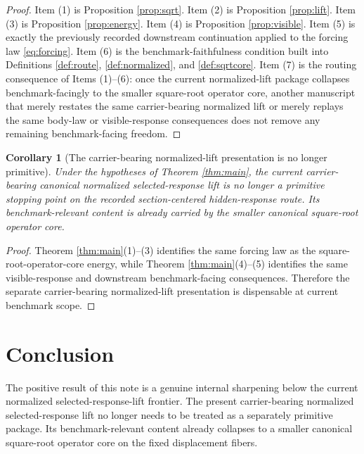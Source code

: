 \documentclass[11pt]{article}
\newtheorem{corollary}{Corollary}
\begin{document}
\begin{proof}
Item (1) is Proposition \ref{prop:sqrt}. Item (2) is Proposition \ref{prop:lift}. Item (3) is Proposition \ref{prop:energy}. Item (4) is Proposition \ref{prop:visible}. Item (5) is exactly the previously recorded downstream continuation applied to the forcing law \eqref{eq:forcing}. Item (6) is the benchmark-faithfulness condition built into Definitions \ref{def:route}, \ref{def:normalized}, and \ref{def:sqrtcore}. Item (7) is the routing consequence of Items (1)--(6): once the current normalized-lift package collapses benchmark-facingly to the smaller square-root operator core, another manuscript that merely restates the same carrier-bearing normalized lift or merely replays the same body-law or visible-response consequences does not remove any remaining benchmark-facing freedom.
\end{proof}

\begin{corollary}[The carrier-bearing normalized-lift presentation is no longer primitive]
\label{cor:nonprimitive}
Under the hypotheses of Theorem \ref{thm:main}, the current carrier-bearing canonical normalized selected-response lift is no longer a primitive stopping point on the recorded section-centered hidden-response route. Its benchmark-relevant content is already carried by the smaller canonical square-root operator core.
\end{corollary}

\begin{proof}
Theorem \ref{thm:main}(1)--(3) identifies the same forcing law as the square-root-operator-core energy, while Theorem \ref{thm:main}(4)--(5) identifies the same visible-response and downstream benchmark-facing consequences. Therefore the separate carrier-bearing normalized-lift presentation is dispensable at current benchmark scope.
\end{proof}

\section{Conclusion}

The positive result of this note is a genuine internal sharpening below the current normalized selected-response-lift frontier. The present carrier-bearing normalized selected-response lift no longer needs to be treated as a separately primitive package. Its benchmark-relevant content already collapses to a smaller canonical square-root operator core on the fixed displacement fibers.
\end{document}

